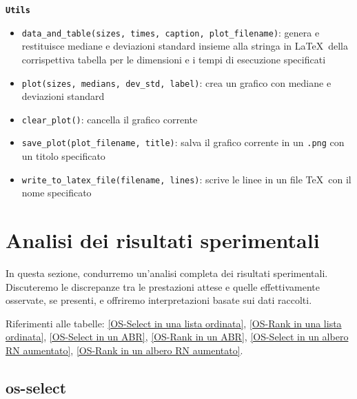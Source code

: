 \documentclass[onecolumn]{article}
\begin{document}
\newpage
{\setlength{\parindent}{0em} \texttt{\textbf{Utils}}}
\begin{itemize}
	\setlength\itemsep{0em}
	\item \verb|data_and_table(sizes, times, caption, plot_filename)|: genera e restituisce mediane e deviazioni standard insieme alla stringa in \LaTeX\ della corrispettiva tabella per le dimensioni e i tempi di esecuzione specificati
	\item \verb|plot(sizes, medians, dev_std, label)|: crea un grafico con mediane e deviazioni standard
	\item \verb|clear_plot()|: cancella il grafico corrente
	\item \verb|save_plot(plot_filename, title)|: salva il grafico corrente in un \texttt{.png} con un titolo specificato
	\item \verb|write_to_latex_file(filename, lines)|: scrive le linee in un file \TeX\ con il nome specificato
\end{itemize}

\section{Analisi dei risultati sperimentali}

In questa sezione, condurremo un'analisi completa dei risultati sperimentali. Discuteremo le discrepanze tra le prestazioni attese e quelle effettivamente osservate, se presenti, e offriremo interpretazioni basate sui dati raccolti. 

Riferimenti alle tabelle: \ref{OS-Select in una lista ordinata}, \ref{OS-Rank in una lista ordinata}, \ref{OS-Select in un ABR}, \ref{OS-Rank in un ABR}, \ref{OS-Select in un albero RN aumentato}, \ref{OS-Rank in un albero RN aumentato}.

\subsection{os-select}
\end{document}
